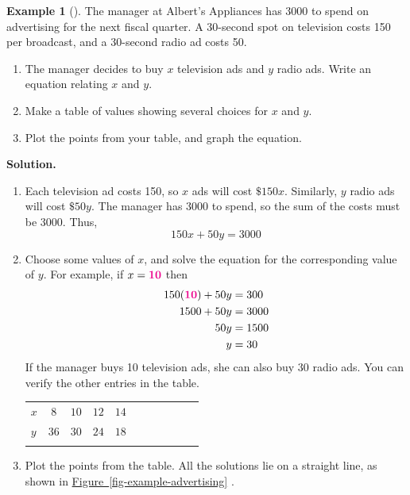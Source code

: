 \documentclass[10pt,]{book}
\theoremstyle{plain}
\theoremstyle{definition}
\theoremstyle{definition}
\newtheorem{example}[theorem]{Example}
\theoremstyle{definition}
\numberwithin{equation}{part}
\newcommand{\hrulethin}  {\noalign{\hrule height 0.04em}}
\newcommand{\hrulethick} {\noalign{\hrule height 0.11em}}
\newcommand{\alert}[1]{\boldsymbol{\color{magenta}{#1}}}
\newcommand{\amp}{&}
\begin{document}
\begin{example}[]\label{example-advertising}
The manager at Albert's Appliances has \textdollar{}3000 to spend on advertising for the next fiscal quarter.  A 30-second spot on television costs \textdollar{}150 per broadcast, and a 30-second radio ad costs \textdollar{}50.%
\leavevmode%
\begin{enumerate}[label=\alph*]
\item\hypertarget{li-45}{}The manager decides to buy \(x\) television ads and \(y\) radio ads.  Write an equation relating \(x\) and \(y\).%
\item\hypertarget{li-46}{}Make a table of values showing several choices for \(x\) and \(y\).%
\item\hypertarget{li-47}{}Plot the points from your table, and graph the equation.%
\end{enumerate}
\par\medskip\noindent%
\textbf{Solution.}\quad \leavevmode%
\begin{enumerate}[label=\alph*]
\item\hypertarget{li-48}{}Each television ad costs \textdollar{}150, so \(x\) ads will cost \(\$150x\).  Similarly, \(y\) radio ads will cost \(\$50y\).  The manager has \textdollar{}3000 to spend, so the sum of the costs must be \textdollar{}3000.  Thus,%
\begin{equation*}
150x+50y=3000
\end{equation*}
%
\item\hypertarget{li-49}{}Choose some values of \(x\), and solve the equation for the corresponding value of \(y\).  For example, if \(x=\alert{10}\) then%
\begin{align*}
150(\alert{10})+50y\amp=300\\
1500+50y\amp=3000\\
50y\amp=1500\\
y\amp=30
\end{align*}
If the manager buys 10 television ads, she can also buy 30 radio ads.  You can verify the other entries in the table.%
\begin{table}
\centering
\begin{tabular}{AcAcAcAcAcA}\hrulethick
\(x\)&\(8\)&\(10\)&\(12\)&\(14\)\tabularnewline\hrulethin
\(y\)&\(36\)&\(30\)&\(24\)&\(18\)\tabularnewline\hrulethin
\end{tabular}
\end{table}
\item\hypertarget{li-50}{}Plot the points from the table.  All the solutions lie on a straight line, as shown in \hyperref[fig-example-advertising]{Figure~\ref{fig-example-advertising}} . \begin{figure}

\end{figure}
\end{enumerate}
\end{example}
\end{document}
